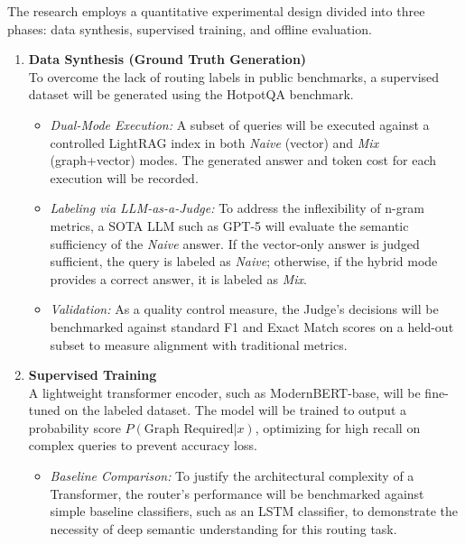 \documentclass[11pt, a4paper]{article}
\begin{document}
The research employs a quantitative experimental design divided into three phases: data synthesis, supervised training, and offline evaluation.

\begin{enumerate}[leftmargin=*, label=\textbf{\arabic*.}]
    \item \textbf{Data Synthesis (Ground Truth Generation)} \\
    To overcome the lack of routing labels in public benchmarks, a supervised dataset will be generated using the HotpotQA benchmark.
    \begin{itemize}[label=--]
        \item \emph{Dual-Mode Execution:} A subset of queries will be executed against a controlled LightRAG index in both \emph{Naive} (vector) and \emph{Mix} (graph+vector) modes. The generated answer and token cost for each execution will be recorded.
        \item \emph{Labeling via LLM-as-a-Judge:} To address the inflexibility of n-gram metrics, a SOTA LLM such as GPT-5 will evaluate the semantic sufficiency of the \emph{Naive} answer. If the vector-only answer is judged sufficient, the query is labeled as \emph{Naive}; otherwise, if the hybrid mode provides a correct answer, it is labeled as \emph{Mix}.
        \item \emph{Validation:} As a quality control measure, the Judge's decisions will be benchmarked against standard F1 and Exact Match scores on a held-out subset to measure alignment with traditional metrics.
    \end{itemize}

    \item \textbf{Supervised Training} \\
    A lightweight transformer encoder, such as ModernBERT-base, will be fine-tuned on the labeled dataset. The model will be trained to output a probability score $P(\text{Graph Required} | x)$, optimizing for high recall on complex queries to prevent accuracy loss.
    \begin{itemize}[label=--]
        \item \emph{Baseline Comparison:} To justify the architectural complexity of a Transformer, the router's performance will be benchmarked against simple baseline classifiers, such as an LSTM classifier, to demonstrate the necessity of deep semantic understanding for this routing task.
    \end{itemize}


\end{enumerate}
\end{document}
